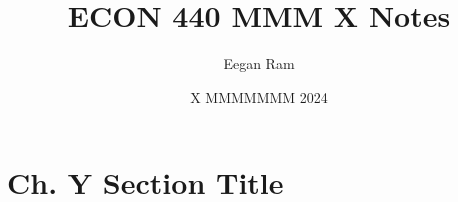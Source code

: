 \documentclass{scrartcl}
\title{ECON 440 MMM X Notes}
\author{Eegan Ram}
\date{X MMMMMMM 2024}
\begin{document}
\maketitle

\section{Ch. Y Section Title}
\end{document}

